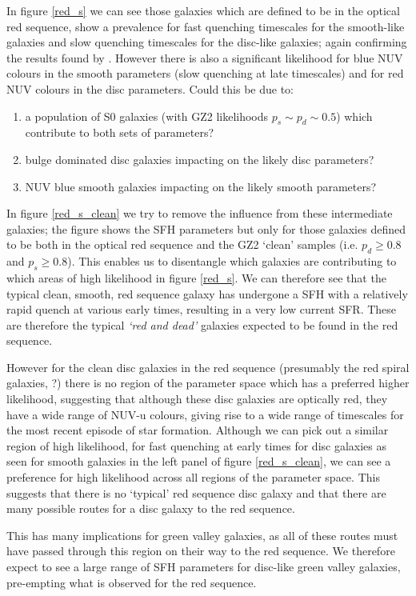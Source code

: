 \documentclass{mn2e}
\begin{document}
In figure \ref{red_s} we can see those galaxies which are defined to be in the optical red sequence, show a prevalence for fast quenching timescales for the smooth-like galaxies and slow quenching timescales for the disc-like galaxies; again confirming the results found by \citet{Sch2014}. However there is also a significant likelihood for blue NUV colours in the smooth parameters (slow quenching at late timescales) and for red NUV colours in the disc parameters. Could this be due to:
\begin{enumerate}
\item a population of S0 galaxies (with GZ2 likelihoods $p_s \sim p_d \sim 0.5$) which contribute to both sets of parameters? 
\item bulge dominated disc galaxies impacting on the likely disc parameters?
\item NUV blue smooth galaxies impacting on the likely smooth parameters? 
\end{enumerate}
In figure \ref{red_s_clean} we try to remove the influence from these intermediate galaxies; the figure shows the SFH parameters but only for those galaxies defined to be both in the optical red sequence and the GZ2 `clean' samples (i.e. $p_d \geq 0.8$ and $p_s \geq 0.8$). This enables us to disentangle which galaxies are contributing to which areas of high likelihood in figure \ref{red_s}. We can therefore see that the typical clean, smooth, red sequence galaxy has undergone a SFH with a relatively rapid quench at various early times, resulting in a very low current SFR. These are therefore the typical \emph{`red and dead'} galaxies expected to be found in the red sequence. 

However for the clean disc  galaxies in the red sequence (presumably the red spiral galaxies, ?) there is no region of the parameter space which has a preferred higher likelihood, suggesting that although these disc galaxies are optically red, they have a wide range of NUV-u colours, giving rise to a wide range of timescales for the most recent episode of star formation. Although we can pick out a similar region of high likelihood, for fast quenching at early times for disc galaxies as seen for smooth galaxies in the left panel of figure \ref{red_s_clean}, we can see a preference for high likelihood across all regions of the parameter space. This suggests that there is no `typical' red sequence disc galaxy and that there are many possible routes for a disc galaxy to the red sequence. 

This has many implications for green valley galaxies, as all of these routes must have passed through this region on their way to the red sequence. We therefore expect to see a large range of SFH parameters for disc-like green valley galaxies, pre-empting what is observed for the red sequence. 
\end{document}
